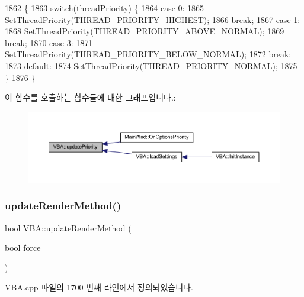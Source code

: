 \begin{DoxyCode}
1862 \{
1863   \textcolor{keywordflow}{switch}(\mbox{\hyperlink{class_v_b_a_acde3a2cf1f42d8222850f9e8b5b28316}{threadPriority}}) \{
1864   \textcolor{keywordflow}{case} 0:
1865     SetThreadPriority(THREAD\_PRIORITY\_HIGHEST);
1866     \textcolor{keywordflow}{break};
1867   \textcolor{keywordflow}{case} 1:
1868     SetThreadPriority(THREAD\_PRIORITY\_ABOVE\_NORMAL);    
1869     \textcolor{keywordflow}{break};
1870   \textcolor{keywordflow}{case} 3:
1871     SetThreadPriority(THREAD\_PRIORITY\_BELOW\_NORMAL);    
1872     \textcolor{keywordflow}{break};
1873   \textcolor{keywordflow}{default}:
1874     SetThreadPriority(THREAD\_PRIORITY\_NORMAL);
1875   \}
1876 \}
\end{DoxyCode}
이 함수를 호출하는 함수들에 대한 그래프입니다.\+:
\nopagebreak
\begin{figure}[H]
\begin{center}
\leavevmode
\includegraphics[width=350pt]{class_v_b_a_a82623f5ce8199b90e3a68fe8c8fee853_icgraph}
\end{center}
\end{figure}
\mbox{\label{class_v_b_a_a1d5b9c4597d5c565ce4d8ba1e594a89f}} 
\subsubsection{\texorpdfstring{update\+Render\+Method()}{updateRenderMethod()}}
{\footnotesize\ttfamily bool V\+B\+A\+::update\+Render\+Method (\begin{DoxyParamCaption}\item[{bool}]{force }\end{DoxyParamCaption})}



V\+B\+A.\+cpp 파일의 1700 번째 라인에서 정의되었습니다.


